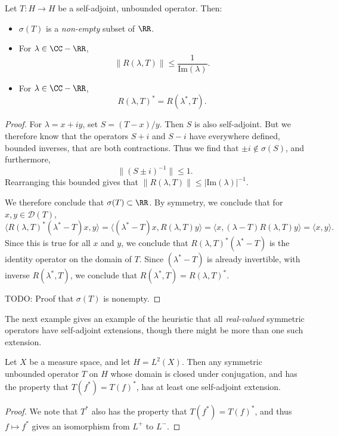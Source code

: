 \begin{theorem}
    Let $T: H \to H$ be a self-adjoint, unbounded operator. Then:
    \begin{itemize}
        \item $\sigma(T)$ is a \emph{non-empty} subset of $\RR$.

        \item For $\lambda \in \CC - \RR$,
        \[ \| R(\lambda, T) \| \leq \frac{1}{\text{Im}(\lambda)}. \]

        \item For $\lambda \in \CC - \RR$,
        \[ R(\lambda,T)^* = R(\lambda^*,T). \]
    \end{itemize}
\end{theorem}
\begin{proof}
    For $\lambda = x + iy$, set $S = (T - x)/y$. Then $S$ is also self-adjoint. But we therefore know that the operators $S + i$ and $S - i$ have everywhere defined, bounded inverses, that are both contractions. Thus we find that $\pm i \not \in \sigma(S)$, and furthermore,
    \[ \| (S \pm i)^{-1} \| \leq 1. \]
    Rearranging this bounded gives that $\| R(\lambda,T) \| \leq |\text{Im}(\lambda)|^{-1}$.

    We therefore conclude that $\sigma(T) \subset \RR$. By symmetry, we conclude that for $x,y \in \mathcal{D}(T)$,
    \[ \langle R(\lambda,T)^* (\lambda^* - T) x, y \rangle = \langle (\lambda^* - T) x, R(\lambda,T) y \rangle = \langle x, (\lambda - T) R(\lambda,T) y \rangle = \langle x, y \rangle.  \]
    Since this is true for all $x$ and $y$, we conclude that $R(\lambda,T)^* (\lambda^* - T)$ is the identity operator on the domain of $T$. Since $(\lambda^* - T)$ is already invertible, with inverse $R(\lambda^*,T)$, we conclude that $R(\lambda^*,T) = R(\lambda,T)^*$.

    TODO: Proof that $\sigma(T)$ is nonempty.
\end{proof}

The next example gives an example of the heuristic that all \emph{real-valued} symmetric operators have self-adjoint extensions, though there might be more than one such extension.

\begin{theorem}
    Let $X$ be a measure space, and let $H = L^2(X)$. Then any symmetric unbounded operator $T$ on $H$ whose domain is closed under conjugation, and has the property that $T(f^*) = T(f)^*$, has at least one self-adjoint extension.
\end{theorem}
\begin{proof}
    We note that $T^*$ also has the property that $T(f^*) = T(f)^*$, and thus $f \mapsto f^*$ gives an isomorphism from $L^+$ to $L^-$.
\end{proof}

